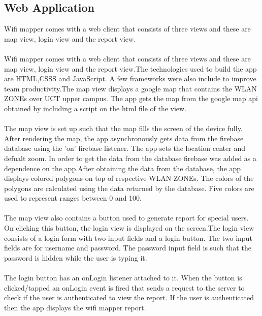 \subsection*{Web Application}
Wifi mapper comes with a web client that consists of three views and these are map view, login view and the report view.  
\paragraph{}Wifi mapper comes with a web client that consists of three views and these are map view, login view and the report view.The technologies used to build the app are HTML,CSSS and JavaScript. A few frameworks were also include to improve team productivity.The map view displays a google map that contains the WLAN ZONEs over UCT upper campus. The app gets the map from the google map api obtained by including a script on the html file of the view.

\paragraph{}The map view is set up such that the map fills the screen of the device fully. After rendering the map, the app asynchronously gets data from the firebase database using the 'on' firebase listener. The app sets the location center and defualt zoom. In order to get the data from the database firebase was added as a dependence on the app.After obtaining the data from the database, the app displays colored polygons on top of respective WLAN ZONEs. The colors of the polygons are calculated using the data returned by the database. Five colors are used to represent ranges between 0 and 100. 

\paragraph{}The map view also contains a button used to generate report for special users. On clicking this button, the login view is displayed on the screen.The login view consists of a login form with two input fields and a login button. The two input fields are for username and password. The password input field is such that the password is hidden while the user is typing it. 

\paragraph{}The login button has an onLogin listener attached to it. When the button is clicked/tapped an onLogin event is fired that sends a request to the server to check if the user is authenticated to view the report. If the user is authenticated then the app displays the wifi mapper report.

